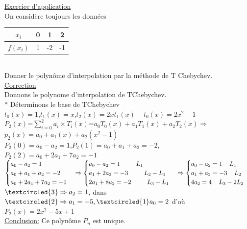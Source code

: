 \underline{Exercice d'application}\\
\vspace{0.3cm}
On considère toujours les données
\begin{tabular}{|c|c|c|c|}
	\hline
	$x_{i}$&0&1&2\\
	\hline
	$f(x_{i})$&1&-2&-1\\
	\hline
\end{tabular}\\

\hspace{0.5cm} Donner le polynôme d'interpolation par la méthode de T Chebychev.\\
\hspace{4cm}\underline{Correction}\\
\hspace{0.6cm}Donnons le polynome d'interpolation de TChebychev.\\
\hspace{0.8cm }$\ast$ Déterminons le base de TChebychev\\
$t_{0}(x)=1$,$t_{1}(x)=x$,$t_{2}(x)=2xt_{1}(x)-t_{0}(x)=2x^{2}-1$\\
$ P_{2}(x)$=$\displaystyle\sum_{i=0}^{2}a_{i}\times T_{i}(x)$=$a_{0}T_{0}(x)+a_{1}T_{1}(x)+a_{2}T_{2}(x) $$\Rightarrow$ $ p_{2}(x)=a_{0}+a_{1}(x)+a_{2}(x^{2}-1) $\\
$ P_{2}(0)=a_{0}-a_{2}=1 $,$ P_{2}(1)=a_{0}+a_{1}+a_{2}=-2 $,$ P_{2}(2)=a_{0}+2a_{1}+7a_{2}=-1 $\\

\vspace{0.5cm}
$\begin{cases} 
a_{0}-a_{2}=1 \\ 
a_{0}+a_{1}+a_{2}=-2\\ 
a_{0}+2a_{1}+7a_{2}=-1
\end{cases} 
\Rightarrow \begin{cases} 
a_{0}-a_{2}=1\hspace{9mm}L_{1}\\ 
a_{1}+2a_{2}=-3\hspace{9mm} L_{2}-L_{1}\\
2a_{1}+8a_{2}=-2\hspace{9mm} L_{3}-L_{1}  
\end{cases}
\Rightarrow \begin{cases} 
a_{0}-a_{2}=1\hspace{4mm} L_{1} \\ 
a_{1}+a_{2}=-3\hspace{4mm} L_{2} \\
4a_{2}=4\hspace{4mm} L_{3}-2L_{2} 
\end{cases}$ \\
\vspace{1cm}
$\textcircled{3}\Rightarrow a_{2}=1$, dans $\textcircled{2}\Rightarrow a_{1}=-5,\textcircled{1} a_{0}=2$
d'où\\
$ P_{2}(x)=2x^{2}-5x+1 $\\
\hspace{0.8cm}\underline{Conclusion:}
Ce polynôme $P_{n} $ est unique.\\

